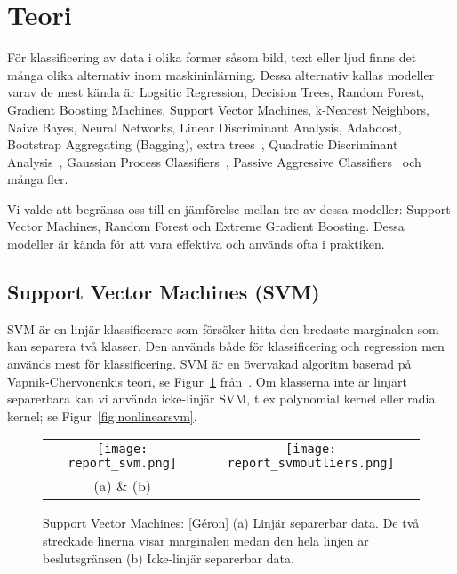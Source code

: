 \documentclass[12pt,a4paper]{article}
\begin{document}
\section{Teori}

För klassificering av data i olika former såsom bild, text eller ljud finns det många olika alternativ inom maskininlärning. Dessa alternativ kallas modeller varav de mest kända är Logsitic Regression, Decision Trees, Random Forest, Gradient Boosting Machines, Support Vector Machines, k-Nearest Neighbors, Naive Bayes, Neural Networks, Linear Discriminant Analysis, Adaboost, Bootstrap Aggregating (Bagging), extra trees~\citep{Geron}, Quadratic Discriminant Analysis~\citep{Bishop}, Gaussian Process Classifiers~\citep{Gibbs}, Passive Aggressive Classifiers~\citep{Crammer} och många fler.

Vi valde att begränsa oss till en jämförelse mellan tre av dessa modeller: Support Vector Machines, Random Forest och Extreme Gradient Boosting. Dessa modeller är kända för att vara effektiva och används ofta i praktiken.

\subsection{Support Vector Machines (SVM)}

SVM är en linjär klassificerare som försöker hitta den bredaste marginalen som kan separera två klasser. Den används både för klassificering och regression men används mest för klassificering. SVM är en övervakad algoritm baserad på Vapnik-Chervonenkis teori, se Figur~\ref{fig:svm} från~\cite{Geron}. Om klasserna inte är linjärt separerbara kan vi använda icke-linjär SVM, t ex polynomial kernel eller radial kernel; se Figur~\ref{fig:nonlinearsvm}.

\begin{figure}[t]
  \centering
  \begin{tabular}{cc}
      \texttt{[image: report\_svm.png]} & 
      \texttt{[image: report\_svmoutliers.png]} \\
      (a) \& (b) \\
  \end{tabular}
  \caption{\footnotesize{Support Vector Machines: [G\'eron] (a) Linjär separerbar data. De två streckade linerna visar marginalen medan den hela linjen är beslutsgränsen (b) Icke-linjär separerbar data.}}\label{fig:svm}
\end{figure}
\end{document}
